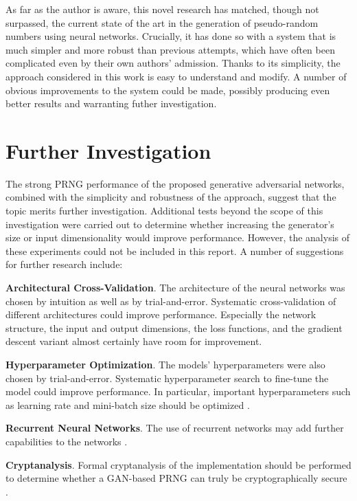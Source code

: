 \documentclass[12pt, titlepage]{report}
\theoremstyle{definition}
\begin{document}
{As far as the author is aware, this novel research has matched, though not surpassed, the current state of the art in the generation of pseudo-random numbers using neural networks. Crucially, it has done so with a system that is much simpler and more robust than previous attempts, which have often been complicated even by their own authors' admission. Thanks to its simplicity, the approach considered in this work is easy to understand and modify. A number of obvious improvements to the system could be made, possibly producing even better results and warranting futher investigation.




\chapter{Further Investigation}
The strong PRNG performance of the proposed generative adversarial networks, combined with the simplicity and robustness of the approach, suggest that the topic merits further investigation.
Additional tests beyond the scope of this investigation were carried out to determine whether increasing the generator's size or input dimensionality would improve performance. However, the analysis of these experiments could not be included in this report. A number of suggestions for further research include:

\textbf{Architectural Cross-Validation}. The architecture of the neural networks was chosen by intuition as well as by trial-and-error. Systematic cross-validation of different architectures could improve performance. Especially the network structure, the input and output dimensions, the loss functions, and the gradient descent variant almost certainly have room for improvement.

\textbf{Hyperparameter Optimization}. The models' hyperparameters were also chosen by trial-and-error. Systematic hyperparameter search to fine-tune the model could improve performance. In particular, important hyperparameters such as learning rate and mini-batch size should be optimized \cite[Neural Networks Part 3: Learning and Ealuation]{karpathy2017cs231n}.

\textbf{Recurrent Neural Networks}. The use of recurrent networks may add further capabilities to the networks \cite[chap. 10]{goodfellow2016deep}.

\textbf{Cryptanalysis}. Formal cryptanalysis of the implementation should be performed to determine whether a GAN-based PRNG can truly be cryptographically secure \cite[Abstract]{rukhin2001statistical}. 

}
\end{document}
